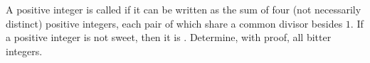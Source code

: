 A positive integer is called  if it can be written as the sum of four (not necessarily distinct) positive integers, each pair of which share a common divisor besides $1$. If a positive integer is not sweet, then it is . Determine, with proof, all bitter integers.
